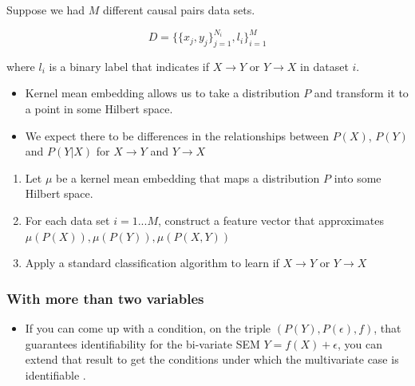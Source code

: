 \documentclass[a0,landscape,25pt,plainsections]{sciposter}
\begin{document}
\begin{multicols}{5}
Suppose we had $M$ different causal pairs data sets. 

\begin{equation*}
D= \{\{x_{j},y_{j}\}_{j=1}^{N_{i}},l_{i}\}_{i=1}^{M}
\end{equation*}

where $l_{i}$ is a binary label that indicates if $X \rightarrow Y$ or $Y \rightarrow X$ in dataset $i$.

\begin{itemize}
\item Kernel mean embedding allows us to take a distribution $P$ and transform it to a point in some Hilbert space.
\item We expect there to be differences in the relationships between $P(X)$, $P(Y)$ and $P(Y|X)$ for $X \rightarrow Y$ and $Y \rightarrow X$
\end{itemize}
 
\begin{algorithm}
\caption{\label{alg:causallearn}}
\begin{enumerate}
\item Let $\mu$ be a kernel mean embedding that maps a distribution $P$ into some Hilbert space.
\item For each data set $i={1...M}$, construct a feature vector that approximates ${\mu(P(X)), \mu(P(Y)),\mu(P(X,Y)) }$
\item Apply a standard classification algorithm to learn if $X\rightarrow Y$ or $Y \rightarrow X$
\end{enumerate}
\end{algorithm}
\subsubsection*{With more than two variables}
\begin{itemize}
\item If you can come up with a condition, on the triple $(P(Y), P(\epsilon), f)$, that guarantees identifiability for the bi-variate SEM $Y = f(X) + \epsilon$, you can extend that result to get the conditions under which the multivariate case is identifiable \cite{Peters2014}.

\end{itemize}

\color{SaddleBrown} %




\color{DarkSlateGray} %





\end{multicols}
\end{document}
